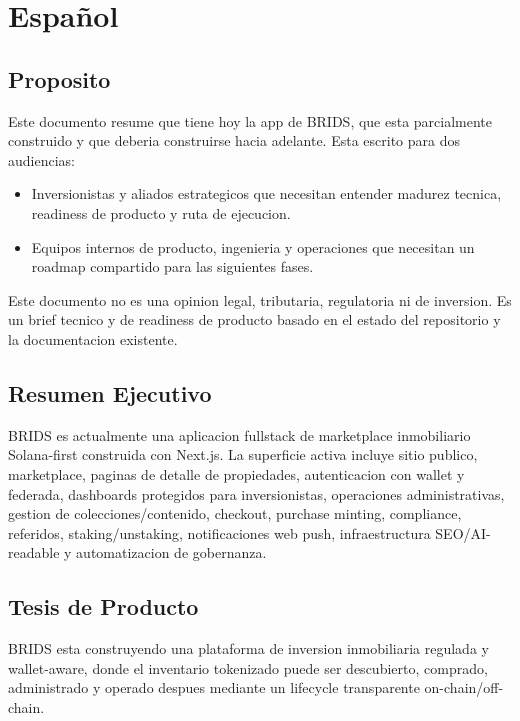\documentclass[
  10pt,
  letterpaper,
]{article}
\providecommand{\tightlist}{%
  \setlength{\itemsep}{0pt}\setlength{\parskip}{0pt}}
\begin{document}
{
\hypersetup{linkcolor=BridsInk}
\setcounter{tocdepth}{2}
\tableofcontents
}
\section{Español}\label{espauxf1ol}

\subsection{Proposito}\label{proposito}

Este documento resume que tiene hoy la app de BRIDS, que esta
parcialmente construido y que deberia construirse hacia adelante. Esta
escrito para dos audiencias:

\begin{itemize}
\tightlist
\item
  Inversionistas y aliados estrategicos que necesitan entender madurez
  tecnica, readiness de producto y ruta de ejecucion.
\item
  Equipos internos de producto, ingenieria y operaciones que necesitan
  un roadmap compartido para las siguientes fases.
\end{itemize}

Este documento no es una opinion legal, tributaria, regulatoria ni de
inversion. Es un brief tecnico y de readiness de producto basado en el
estado del repositorio y la documentacion existente.

\subsection{Resumen Ejecutivo}\label{resumen-ejecutivo}

BRIDS es actualmente una aplicacion fullstack de marketplace
inmobiliario Solana-first construida con Next.js. La superficie activa
incluye sitio publico, marketplace, paginas de detalle de propiedades,
autenticacion con wallet y federada, dashboards protegidos para
inversionistas, operaciones administrativas, gestion de
colecciones/contenido, checkout, purchase minting, compliance,
referidos, staking/unstaking, notificaciones web push, infraestructura
SEO/AI-readable y automatizacion de gobernanza.

\subsection{Tesis de Producto}\label{tesis-de-producto}

BRIDS esta construyendo una plataforma de inversion inmobiliaria
regulada y wallet-aware, donde el inventario tokenizado puede ser
descubierto, comprado, administrado y operado despues mediante un
lifecycle transparente on-chain/off-chain.
\end{document}
